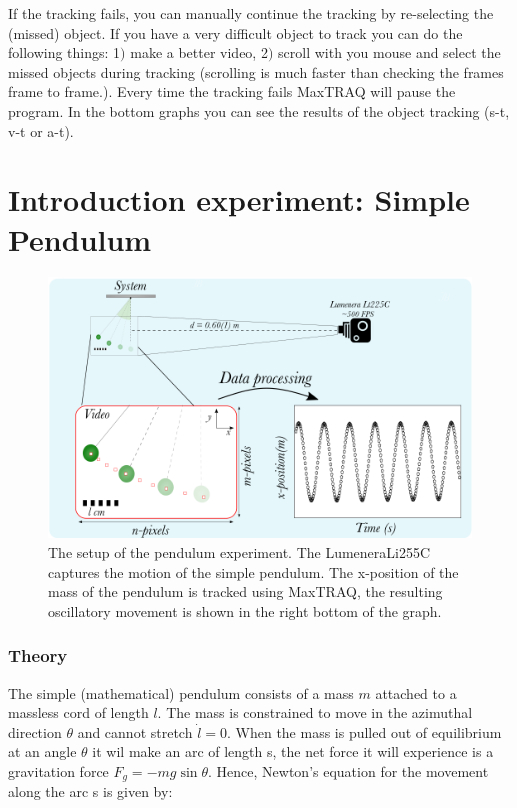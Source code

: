 \documentclass{article}
\begin{document}
\begin{itemize}
If the tracking fails, you can manually continue the tracking by re-selecting the (missed) object. If you have a very difficult object to track you can do the following things: 1$)$ make a better video, 2$)$ scroll with you mouse and select the missed objects during tracking (scrolling is much faster than checking the frames frame to frame.). Every time the tracking fails MaxTRAQ will pause the program. In the bottom graphs you can see the results of the object tracking (s-t, v-t or a-t).
\end{itemize}

\newpage

\section{Introduction experiment: Simple Pendulum}
\begin{figure}[H]
    \centering
    \includegraphics[width=12cm]{figures/Pendulum setup.png}
    \caption{The setup of the pendulum experiment. The LumeneraLi255C captures the motion of the simple pendulum. The x-position of the mass of the pendulum is tracked using MaxTRAQ, the resulting oscillatory movement is shown in the right bottom of the graph.}
    \label{Figure: Pendulum setup}
\end{figure}
\subsubsection{Theory}
The simple (mathematical) pendulum consists of a mass $m$ attached to a massless cord of length $l$. The mass is constrained to move in the azimuthal direction $\theta$ and cannot stretch $\dot{l}=0$. When the mass is pulled out of equilibrium at an angle $\theta$ it wil make an arc of length s, the net force it will experience is a gravitation force $F_g = -mg\sin{\theta}$. Hence, Newton's equation for the movement along the arc s is given by:
\end{document}

